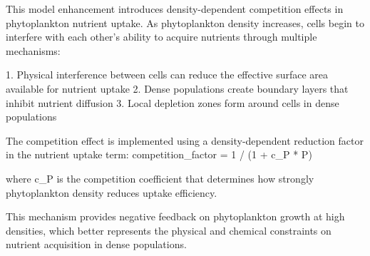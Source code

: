 This model enhancement introduces density-dependent competition effects in phytoplankton nutrient uptake. As phytoplankton density increases, cells begin to interfere with each other's ability to acquire nutrients through multiple mechanisms:

1. Physical interference between cells can reduce the effective surface area available for nutrient uptake
2. Dense populations create boundary layers that inhibit nutrient diffusion
3. Local depletion zones form around cells in dense populations

The competition effect is implemented using a density-dependent reduction factor in the nutrient uptake term:
competition_factor = 1 / (1 + c_P * P)

where c_P is the competition coefficient that determines how strongly phytoplankton density reduces uptake efficiency.

This mechanism provides negative feedback on phytoplankton growth at high densities, which better represents the physical and chemical constraints on nutrient acquisition in dense populations.
